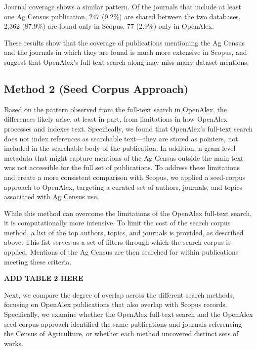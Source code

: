 \documentclass[
  letterpaper,
  DIV=11,
  numbers=noendperiod]{scrartcl}
\begin{document}
Journal coverage shows a similar pattern. Of the journals that include
at least one Ag Census publication, 247 (9.2\%) are shared between the
two databases, 2,362 (87.9\%) are found only in Scopus, 77 (2.9\%) only
in OpenAlex.

These results show that the coverage of publications mentioning the Ag
Census and the journals in which they are found is much more extensive
in Scopus, and suggest that OpenAlex's full-text search along may miss
many dataset mentions.

\subsection{\texorpdfstring{\Large Method 2 (Seed Corpus
Approach)}{Method 2 (Seed Corpus Approach)}}\label{method-2-seed-corpus-approach}

Based on the pattern observed from the full-text search in OpenAlex, the
differences likely arise, at least in part, from limitations in how
OpenAlex processes and indexes text. Specifically, we found that
OpenAlex's full-text search does not index references as searchable
text---they are stored as pointers, not included in the searchable body
of the publication. In addition, n-gram-level metadata that might
capture mentions of the Ag Census outside the main text was not
accessible for the full set of publications. To address these
limitations and create a more consistent comparison with Scopus, we
applied a seed-corpus approach to OpenAlex, targeting a curated set of
authors, journals, and topics associated with Ag Census use.

\pagebreak

While this method can overcome the limitations of the OpenAlex full-text
search, it is computationally more intensive. To limit the cost of the
search corpus method, a list of the top authors, topics, and journals is
provided, as described above. This list serves as a set of filters
through which the search corpus is applied. Mentions of the Ag Census
are then searched for within publications meeting these criteria.

\textbf{ADD TABLE 2 HERE}

Next, we compare the degree of overlap across the different search
methods, focusing on OpenAlex publications that also overlap with Scopus
records. Specifically, we examine whether the OpenAlex full-text search
and the OpenAlex seed-corpus approach identified the same publications
and journals referencing the Census of Agriculture, or whether each
method uncovered distinct sets of works.
\end{document}
